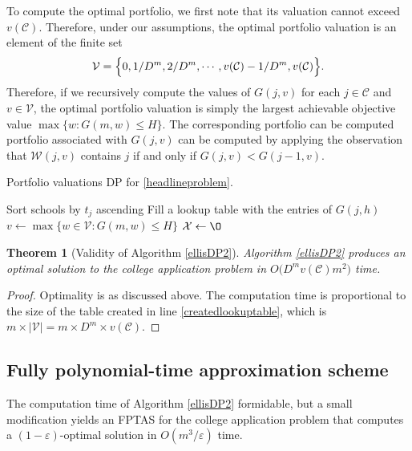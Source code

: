 \documentclass[11pt]{article} %
\newtheorem{theorem}{Theorem}
\theoremstyle{definition}
\begin{document}
To compute the optimal portfolio, we first note that its valuation cannot exceed $v(\mathcal{C})$. Therefore, under our assumptions, the optimal portfolio valuation is an element of the finite set
\begin{equation}
\mathcal{V} = \Bigl\{0, 1/D^m, 2/D^m, \cdots, v(\mathcal{C}) - 1/ D^m, v(\mathcal{C})\Bigr\}.
\end{equation}
Therefore, if we recursively compute the values of $G(j, v)$ for each $j\in \mathcal{C}$ and $v \in \mathcal{V}$, the optimal portfolio valuation is simply the largest achievable objective value $\max\{ w: G(m, w) \leq H\}$. The corresponding portfolio can be computed  portfolio associated with $G(j, v)$ can be computed by applying the observation that $\mathcal{W}(j, v)$ contains $j$ if and only if $G(j, v) < G(j-1, v)$.

\begin{algorithm}[h] 
\caption{Portfolio valuations DP for \eqref{headlineproblem}.} \label{ellisDP2}
Sort schools by $t_j$ ascending\;
Fill a lookup table with the entries of $G(j, h)$\; \label{createdlookuptable}
$v\gets  \max\{ w \in \mathcal{V} : G(m, w) \leq H\}$\; \label{vrecordedhere}
$\mathcal{X} \gets \O$\;
\;
\end{algorithm}

\begin{theorem}[Validity of Algorithm \ref{ellisDP2}]
Algorithm \ref{ellisDP2} produces an optimal solution to the college application problem in $O\bigl( D^m v(\mathcal{C}) m^2 \bigr)$ time.
\end{theorem}

\begin{proof}
Optimality is as discussed above. The computation time is proportional to the size of the table created in line \ref{createdlookuptable}, which is $m \times |\mathcal{V}| = m \times D^m \times v(\mathcal{C}) $. 
\end{proof}

\subsection{Fully polynomial-time approximation scheme}
The computation time of Algorithm \ref{ellisDP2} formidable, but a small modification yields an FPTAS for the college application problem that computes a $(1 - \varepsilon)$-optimal solution in $O(m^3 / \varepsilon)$ time.
\end{document}
